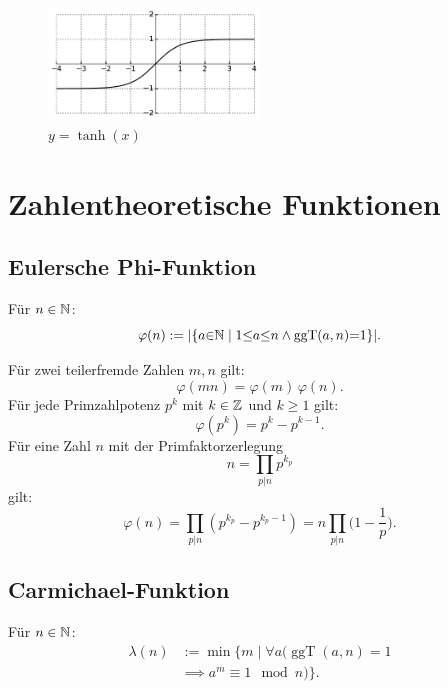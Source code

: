 \begin{figure}[h]
\includegraphics[width=0.5\textwidth]{img/tanh.pdf}
\caption{$y=\tanh(x)$}
\end{figure}

\newpage
\section{Zahlentheoretische Funktionen}
\subsection{Eulersche Phi-Funktion}

\begin{definition}
Für $n\in\mathbb N$:
\begin{equation}
\varphi(n) := |\{a{\in}\mathbb N\mid 1{\le}a{\le}n\wedge\operatorname{ggT}(a,n){=}1\}|.
\end{equation}
\end{definition}

\noindent
Für zwei teilerfremde Zahlen $m,n$ gilt:
\begin{equation}
\varphi(mn) = \varphi(m)\,\varphi(n).
\end{equation}
Für jede Primzahlpotenz $p^k$ mit $k\in\mathbb Z$ und $k\ge 1$ gilt:
\begin{equation}
\varphi(p^k) = p^k-p^{k-1}.
\end{equation}
Für eine Zahl $n$ mit der Primfaktorzerlegung
\begin{equation}
n=\prod_{p|n} p^{k_p}
\end{equation}
gilt:
\begin{equation}
\varphi(n) = \prod_{p|n} (p^{k_p}-p^{k_p-1})
= n\prod_{p|n} \Big(1-\frac{1}{p}\Big).
\end{equation}

\subsection{Carmichael-Funktion}
\begin{definition}
Für $n\in\mathbb N$:
\begin{equation}
\begin{split}
\lambda(n) &:= \min\{m\mid \forall a(\operatorname{ggT}(a,n)=1\\
&\implies a^m\equiv 1\mod n)\}.
\end{split}
\end{equation}
\end{definition}
